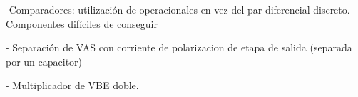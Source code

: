 -Comparadores: utilización de operacionales en vez del par diferencial discreto. Componentes difíciles de conseguir

- Separación de VAS con corriente de polarizacion de etapa de salida (separada por un capacitor)

- Multiplicador de VBE doble.


